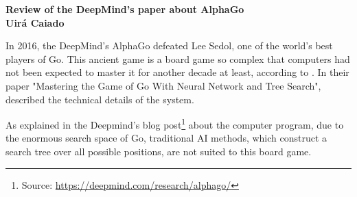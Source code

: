 \documentclass[a4paper]{article}
\begin{document}

\begin{center}

{\bf \large Review of the DeepMind's paper about AlphaGo \\ \small Uirá Caiado}
\end{center}




In 2016, the DeepMind's AlphaGo defeated Lee Sedol, one of the world’s best players of Go. This ancient game is a board game so complex that computers had not been expected to master it for another decade at least, according to \cite{Economist2017a}. In their paper "Mastering the Game of Go With Neural Network and Tree Search", \cite{Silver:2016hl} described the technical details of the system.

As explained in the Deepmind's blog post\footnote{Source: \url{https://deepmind.com/research/alphago/}} about the computer program, due to the enormous search space of Go, traditional AI methods, which construct a search tree over all possible positions, are not suited to this board game.


































\end{document}
